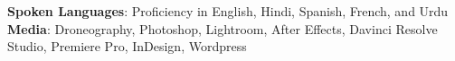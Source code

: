 % 
% 
% 
% 
% 
% 

\begin{itemize}[leftmargin=0in, label={}]
    \small{\item{
     \textbf{Spoken Languages}{: Proficiency in English, Hindi, Spanish,
     French, and Urdu} \\
     \textbf{Media}{: Droneography, Photoshop, Lightroom, After Effects, Davinci Resolve Studio, 
     Premiere Pro, InDesign, Wordpress} \\
     
    }}
\end{itemize}
